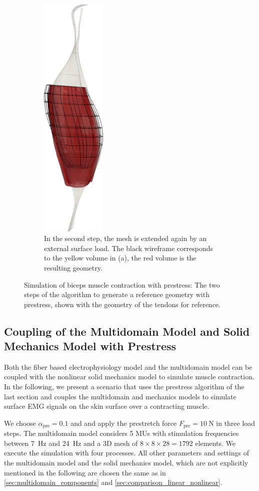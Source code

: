 \begin{figure}
\begin{subfigure}[t]{0.48\textwidth}
    \includegraphics[height=12cm]{images/results/application/neuromuscular_prestretch_2.png}%
    \caption{In the second step, the mesh is extended again by an external surface load. The black wireframe corresponds to the yellow volume in (a), the red volume is the resulting geometry.}%
    \label{fig:neuromuscular_prestretch_2}%
  \end{subfigure}
  \hfill
  \caption{Simulation of biceps muscle contraction with prestress: The two steps of the algorithm to generate a reference geometry with prestress, shown with the geometry of the tendons for reference.}%
  \label{fig:neuromuscular_prestretch}%
\end{figure}%


\subsection{Coupling of the Multidomain Model and Solid Mechanics Model with Prestress}

Both the fiber based electrophysiology model and the multidomain model can be coupled with the nonlinear solid mechanics model to simulate muscle contraction. In the following, we present a scenario that uses the prestress algorithm of the last section and couples the multidomain and mechanics models to simulate surface EMG signals on the skin surface over a contracting muscle.

We choose $\alpha_\text{pre}=0.1$ and and apply the prestretch force $F_\text{pre}=\SI{10}{\newton}$ in three load steps. The multidomain model considers 5 MUs with stimulation frequencies between \SI{7}{\hertz} and \SI{24}{\hertz} and a 3D mesh of $8 \times 8 \times 28 = 1792$ elements. We execute the simulation with four processes. All other parameters and settings of the multidomain model and the solid mechanics model, which are not explicitly mentioned in the following are chosen the same as in \cref{sec:multidomain_components} and \cref{sec:comparison_linear_nonlinear}.

